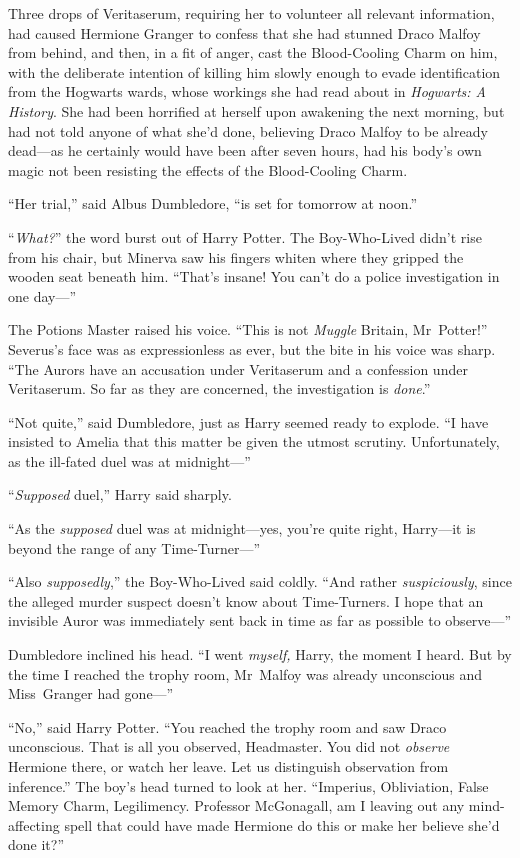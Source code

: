 Three drops of Veritaserum, requiring her to volunteer all relevant information, had caused Hermione Granger to confess that she had stunned Draco Malfoy from behind, and then, in a fit of anger, cast the Blood-Cooling Charm on him, with the deliberate intention of killing him slowly enough to evade identification from the Hogwarts wards, whose workings she had read about in \emph{Hogwarts: A History}. She had been horrified at herself upon awakening the next morning, but had not told anyone of what she’d done, believing Draco Malfoy to be already dead—as he certainly would have been after seven hours, had his body’s own magic not been resisting the effects of the Blood-Cooling Charm.

“Her trial,” said Albus Dumbledore, “is set for tomorrow at noon.”

“\emph{What?}” the word burst out of Harry Potter. The Boy-Who-Lived didn’t rise from his chair, but Minerva saw his fingers whiten where they gripped the wooden seat beneath him. “That’s insane! You can’t do a police investigation in one day—”

The Potions Master raised his voice. “This is not \emph{Muggle} Britain, Mr~Potter!” Severus’s face was as expressionless as ever, but the bite in his voice was sharp. “The Aurors have an accusation under Veritaserum and a confession under Veritaserum. So far as they are concerned, the investigation is \emph{done}.”

“Not quite,” said Dumbledore, just as Harry seemed ready to explode. “I have insisted to Amelia that this matter be given the utmost scrutiny. Unfortunately, as the ill-fated duel was at midnight—”

“\emph{Supposed} duel,” Harry said sharply.

“As the \emph{supposed} duel was at midnight—yes, you’re quite right, Harry—it is beyond the range of any Time-Turner—”

“Also \emph{supposedly},” the Boy-Who-Lived said coldly. “And rather \emph{suspiciously}, since the alleged murder suspect doesn’t know about Time-Turners. I hope that an invisible Auror was immediately sent back in time as far as possible to observe—”

Dumbledore inclined his head. “I went \emph{myself,} Harry, the moment I heard. But by the time I reached the trophy room, Mr~Malfoy was already unconscious and Miss~Granger had gone—”

“No,” said Harry Potter. “You reached the trophy room and saw Draco unconscious. That is all you observed, Headmaster. You did not \emph{observe} Hermione there, or watch her leave. Let us distinguish observation from inference.” The boy’s head turned to look at her. “Imperius, Obliviation, False Memory Charm, Legilimency. Professor McGonagall, am I leaving out any mind-affecting spell that could have made Hermione do this or make her believe she’d done it?”

